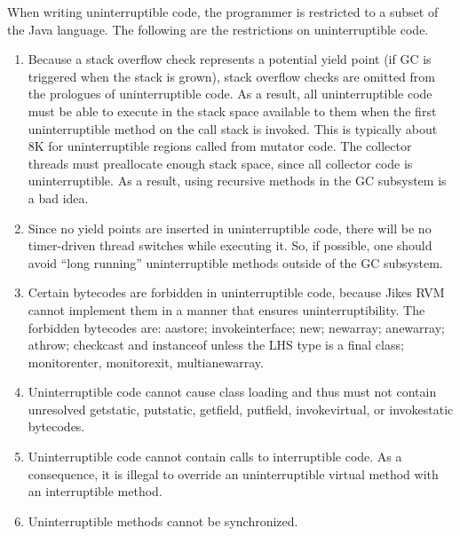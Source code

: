 When writing uninterruptible code, the programmer is restricted to a
subset of the Java language.  The following are the restrictions on
uninterruptible code.
\begin{enumerate}
\item{} Because a stack overflow check represents a potential yield
point (if GC is triggered when the stack is grown), stack overflow
checks are omitted from the prologues of uninterruptible code.  As a
result, all uninterruptible code must be able to execute in the
stack space available to them when the first uninterruptible method on
the call stack is invoked.  This is typically about 8K for
uninterruptible regions called from mutator code.  The collector
threads must preallocate enough stack space, since all collector code
is uninterruptible. As a result, using recursive methods in the GC
subsystem is a bad idea.
\item{} Since no yield points are inserted in uninterruptible code,
there will be no timer-driven thread switches while executing it.  So,
if possible, one should avoid ``long running'' uninterruptible methods
outside of the GC subsystem.

\item{} Certain bytecodes are forbidden in uninterruptible code,
because Jikes RVM cannot implement them in a manner that ensures
uninterruptibility. The forbidden bytecodes are: {\instruction aastore};
{\instruction invokeinterface}; {\instruction new}; {\instruction
newarray}; {\instruction anewarray}; {\instruction athrow};
{\instruction checkcast} and
{\instruction instanceof} unless the LHS type is a final class;
{\instruction monitorenter},
{\instruction monitorexit}, {\instruction multianewarray}. 
\item{} Uninterruptible code cannot cause class loading and thus must
not contain unresolved {\instruction getstatic}, {\instruction
putstatic}, {\instruction getfield}, {\instruction putfield},
{\instruction invokevirtual}, or {\instruction invokestatic} bytecodes. 
\item{} Uninterruptible code cannot contain calls to interruptible
code. As a consequence, it is illegal to override an uninterruptible
virtual method with an interruptible method.
\item{} Uninterruptible methods cannot be synchronized. 
\end{enumerate}

